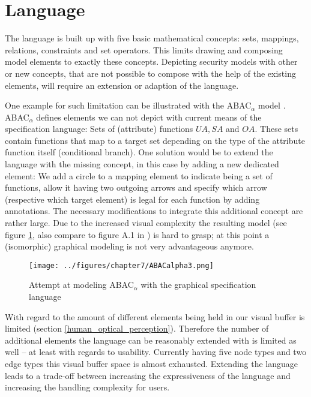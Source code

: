 \documentclass[twoside, openright, 12pt]{book}
\begin{document}
\section{Language}
\label{future_GSL}
The language is built up with five basic mathematical concepts: sets, mappings, relations, constraints and set operators.
This limits drawing and composing model elements to exactly these concepts.
Depicting security models with other or new concepts, that are not possible to compose with the help of the existing elements, will require an extension or adaption of the language.

One example for such limitation can be illustrated with the ABAC$_\alpha$ model \citep{Jin12}.
ABAC$_\alpha$ defines elements we can not depict with current means of the specification language: Sets of (attribute) functions $\mathit{UA}, \mathit{SA}$ and $\mathit{OA}$.
These sets contain functions that map to a target set depending on the type of the attribute function itself (conditional branch).
One solution would be to extend the language with the missing concept, in this case by adding a new dedicated element:
We add a circle to a mapping element to indicate being a set of functions, allow it having two outgoing arrows and specify which arrow (respective which target element) is legal for each function by adding annotations.
The necessary modifications to integrate this additional concept are rather large.
Due to the increased visual complexity the resulting model (see figure \ref{fig:ABACalpha}, also compare to figure A.1 in \cite{Amthor18}) is hard to grasp; at this point a (isomorphic) graphical modeling is not very advantageous anymore.

\begin{figure}[bht]
	\centering
	\texttt{[image: ../figures/chapter7/ABACalpha3.png]}
	\caption{Attempt at modeling ABAC$_\alpha$ with the graphical specification language}
	\label{fig:ABACalpha}
\end{figure}

With regard to \cite{Zeckzer14a} the amount of different elements being held in our visual buffer is limited (section \ref{human_optical_perception}).
Therefore the number of additional elements the language can be reasonably extended with is limited as well -- at least with regards to usability.
Currently having five node types and two edge types this visual buffer space is almost exhausted.
Extending the language leads to a trade-off between increasing the expressiveness of the language and increasing the handling complexity for users.
\end{document}
